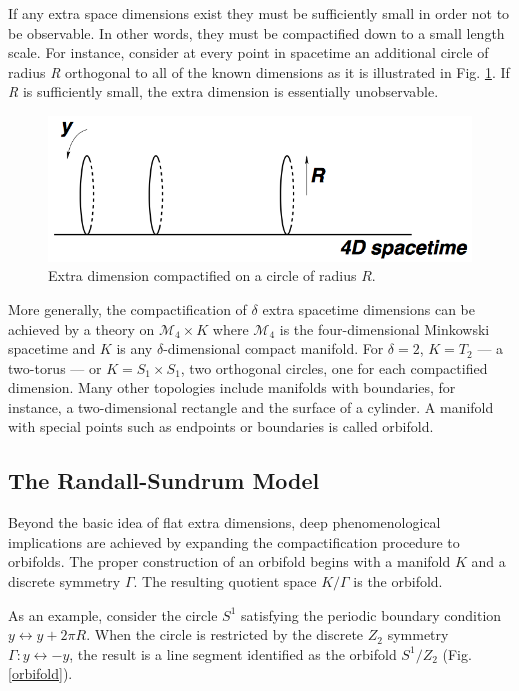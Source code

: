 If any extra space dimensions exist they must be sufficiently small in order not to be observable. In other words, they must be compactified down to a small length scale. For instance, consider at every point in spacetime an additional circle of radius \textsf{\textit{R}} orthogonal to all of the known dimensions as it is illustrated in Fig. \ref{circle}. If \textsf{\textit{R}} is sufficiently small,  the extra dimension is essentially unobservable.

\begin{figure}[htb!!]
\centering
\includegraphics[scale=0.30]{figures/theory/circle.png}
\caption[Circle compactification]{Extra dimension compactified on a circle of radius $R$.}
\label{circle}
\end{figure}

More generally, the compactification of $\delta$ extra spacetime dimensions can be achieved by a theory on $\mathcal{M}_4\times K$ where $\mathcal{M}_4$ is the four-dimensional Minkowski spacetime and $K$ is any $\delta$-dimensional compact manifold. For $\delta=2$, $K=T_2$ --- a two-torus --- or $K = S_1 \times S_1$, two orthogonal circles, one for each compactified dimension. Many other topologies include manifolds with boundaries, for instance, a two-dimensional rectangle and the surface of a cylinder. A manifold with special points such as endpoints or boundaries is called orbifold.

\subsection{The Randall-Sundrum Model}
Beyond the basic idea of flat extra dimensions, deep phenomenological implications are achieved by expanding the compactification procedure to orbifolds. The proper construction of an orbifold begins with a manifold $K$ and a discrete symmetry $\Gamma$. The resulting quotient space $K/\Gamma$ is the orbifold. 

As an example, consider the circle $S^1$ satisfying the periodic boundary condition $y \leftrightarrow y + 2\pi R$. When the circle is restricted by the discrete $Z_2$ symmetry $\Gamma: y\leftrightarrow -y $, the result is a line segment identified as the orbifold $S^1 / Z_2$ (Fig. \ref{orbifold}). 


